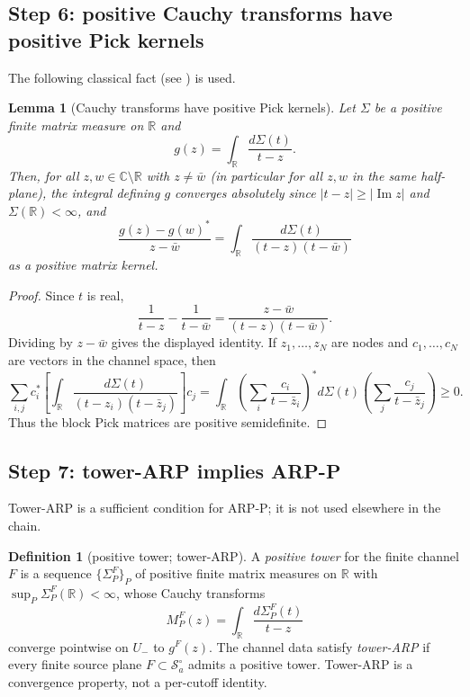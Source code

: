 \documentclass[11pt]{amsart}
\newtheorem{lemma}[theorem]{Lemma}
\theoremstyle{definition}
\newtheorem{definition}[theorem]{Definition}
\theoremstyle{remark}
\theoremstyle{definition}
\renewcommand{\Im}{\operatorname{Im}}
\newcommand{\cS}{\mathcal{S}}
\newcommand{\R}{\mathbb{R}}
\newcommand{\C}{\mathbb{C}}
\begin{document}
\subsection{Step 6: positive Cauchy transforms have positive Pick kernels}

The following classical fact (see \cite{Akhiezer}) is used.

\begin{lemma}[Cauchy transforms have positive Pick kernels]\label{lem:cauchy-pick}
Let $\Sigma$ be a positive finite matrix measure on $\R$ and
\[
   g(z)=\int_\R\frac{d\Sigma(t)}{t-z}.
\]
Then, for all $z,w\in\C\setminus\R$ with $z\ne\bar w$ \textnormal{(in particular for all $z,w$ in the
same half-plane)}, the integral defining $g$ converges absolutely since
$|t-z|\ge|\Im z|$ and $\Sigma(\R)<\infty$, and
\[
   \frac{g(z)-g(w)^*}{z-\bar w}
   =
   \int_\R
      \frac{d\Sigma(t)}{(t-z)(t-\bar w)}
\]
as a positive matrix kernel.
\end{lemma}

\begin{proof}
Since $t$ is real,
\[
   \frac{1}{t-z}-\frac{1}{t-\bar w}
   =
   \frac{z-\bar w}{(t-z)(t-\bar w)}.
\]
Dividing by $z-\bar w$ gives the displayed identity.  If $z_1,\ldots,z_N$ are
nodes and $c_1,\ldots,c_N$ are vectors in the channel space, then
\[
   \sum_{i,j}
   c_i^*
   \left[
      \int_\R\frac{d\Sigma(t)}{(t-z_i)(t-\bar z_j)}
   \right]
   c_j
   =
   \int_\R
      \left(\sum_i\frac{c_i}{t-\bar z_i}\right)^*
      d\Sigma(t)
      \left(\sum_j\frac{c_j}{t-\bar z_j}\right)
   \ge0.
\]
Thus the block Pick matrices are positive semidefinite.
\end{proof}

\subsection{Step 7: tower-ARP implies ARP-P}

Tower-ARP is a sufficient condition for ARP-P; it is not used elsewhere in the chain.

\begin{definition}[positive tower; tower-ARP]\label{def:ARP}
A \emph{positive tower} for the finite channel $F$ is a sequence $\{\Sigma_P^F\}_P$ of positive
finite matrix measures on $\R$ with $\sup_P\Sigma_P^F(\R)<\infty$, whose Cauchy transforms
\[
   M_P^F(z)=\int_\R\frac{d\Sigma_P^F(t)}{t-z}
\]
converge pointwise on $U_-$ to $g^F(z)$.  The channel data satisfy \emph{tower-ARP} if every finite
source plane $F\subset\cS_a^\circ$ admits a positive tower.  Tower-ARP is a convergence property, not a
per-cutoff identity.
\end{definition}
\end{document}
